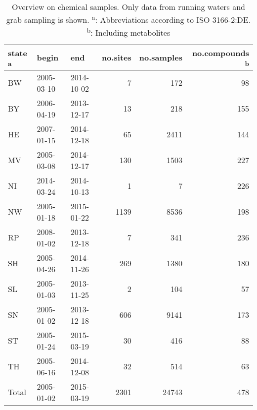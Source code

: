 \begin{table}[ht]
\centering
\caption{Overview on chemical samples. Only data from running waters and grab
sampling is shown. \textsuperscript{a}: Abbreviations according to ISO 3166-2:DE. 
      \textsuperscript{b}: Including metabolites} 
\label{tab:phch_overview}
\begin{tabular}{lllrrr}
  \toprule
state \textsuperscript{a} & begin & end & no.sites & no.samples & no.compounds \textsuperscript{b} \\ 
  \midrule
BW & 2005-03-10 & 2014-10-02 & 7 & 172 & 98 \\ 
  BY & 2006-04-19 & 2013-12-17 & 13 & 218 & 155 \\ 
  HE & 2007-01-15 & 2014-12-18 & 65 & 2411 & 144 \\ 
  MV & 2005-03-08 & 2014-12-17 & 130 & 1503 & 227 \\ 
  NI & 2014-03-24 & 2014-10-13 & 1 & 7 & 226 \\ 
  NW & 2005-01-18 & 2015-01-22 & 1139 & 8536 & 198 \\ 
  RP & 2008-01-02 & 2013-12-18 & 7 & 341 & 236 \\ 
  SH & 2005-04-26 & 2014-11-26 & 269 & 1380 & 180 \\ 
  SL & 2005-01-03 & 2013-11-25 & 2 & 104 & 57 \\ 
  SN & 2005-01-02 & 2013-12-18 & 606 & 9141 & 173 \\ 
  ST & 2005-01-24 & 2015-03-19 & 30 & 416 & 88 \\ 
  TH & 2005-06-16 & 2014-12-08 & 32 & 514 & 63 \\ 
   \midrule
Total & 2005-01-02 & 2015-03-19 & 2301 & 24743 & 478 \\ 
   \bottomrule
\end{tabular}
\end{table}
